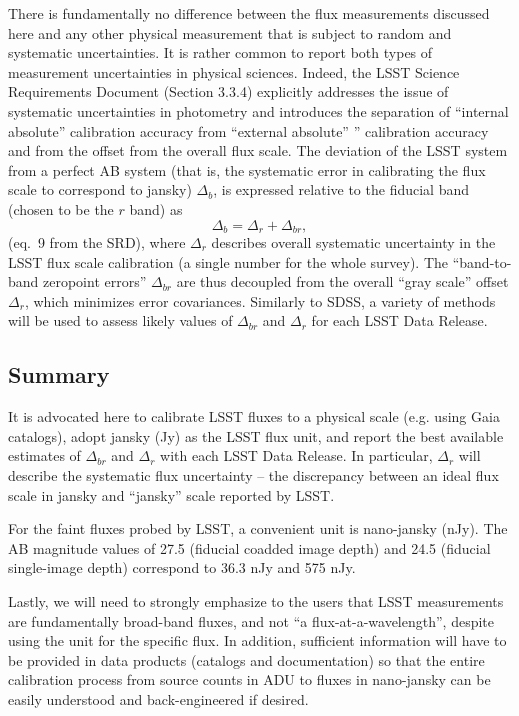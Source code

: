 \documentclass[DM,lsstdraft,toc,usenatbib]{lsstdoc}
\begin{document}
There is fundamentally no difference between the flux measurements discussed
here and any other physical measurement that is subject to random and systematic
uncertainties. It is rather common to report both types of measurement uncertainties
in physical sciences. Indeed, the LSST  Science Requirements Document (Section 3.3.4)
explicitly addresses the issue of systematic uncertainties in photometry and
introduces the separation of ``internal absolute'' calibration accuracy
from ``external absolute'' ” calibration accuracy and from the offset from the
overall flux scale. The deviation of the LSST system from a perfect AB system
(that is, the systematic error in calibrating the flux scale to correspond to jansky)
$\Delta_b$, is expressed relative to the fiducial band (chosen to be the $r$ band)
as \begin{equation}
             \Delta_b = \Delta_r + \Delta_{br},
\end{equation}
(eq.~9 from the SRD), where $\Delta_r$ describes overall systematic uncertainty
in the LSST flux scale calibration (a single number for the whole survey). The
``band-to-band zeropoint errors'' $\Delta_{br}$ are thus decoupled from the overall
``gray scale'' offset $\Delta_{r}$, which minimizes error covariances. Similarly to SDSS,
a variety of methods will be used to assess likely values of $\Delta_{br}$ and
$\Delta_r$ for each LSST Data Release.


\subsection{Summary}

It is advocated here to calibrate LSST fluxes to a physical scale (e.g. using
Gaia catalogs), adopt jansky (Jy) as the LSST flux unit, and report the best available
estimates of $\Delta_{br}$ and $\Delta_r$ with each LSST Data Release. In particular,
$\Delta_r$ will describe the systematic flux uncertainty --  the discrepancy between an
ideal flux scale in jansky and ``jansky'' scale reported by LSST.

For the faint fluxes probed by LSST, a convenient unit is nano-jansky (nJy).
The AB magnitude values of 27.5 (fiducial coadded image depth)  and 24.5 (fiducial
single-image depth) correspond to 36.3 nJy and 575 nJy.

Lastly, we will need to strongly emphasize to the users that LSST measurements are
fundamentally broad-band fluxes, and not ``a flux-at-a-wavelength'', despite using the
unit for the specific flux. In addition, sufficient information will have to be provided
in data products (catalogs and documentation) so that the entire calibration process from
source counts in ADU to fluxes in nano-jansky can be easily understood and back-engineered
if desired.
\end{document}
